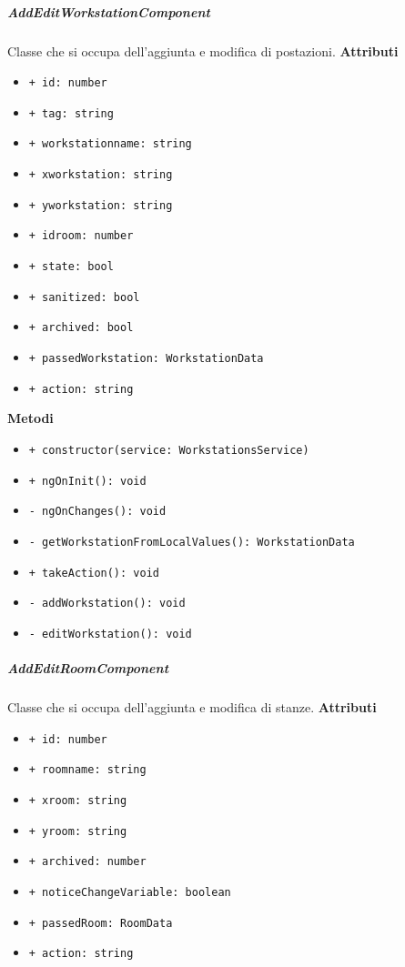 \subparagraph{AddEditWorkstationComponent}
Classe che si occupa dell'aggiunta e modifica di postazioni. \newline
\textbf{Attributi}
\begin{itemize}
	\item \texttt{+ id: number } 
	\item \texttt{+ tag: string } 
	\item \texttt{+ workstationname: string } 
	\item \texttt{+ xworkstation: string } 
	\item \texttt{+ yworkstation: string } 
	\item \texttt{+ idroom: number } 
	\item \texttt{+ state: bool } 
	\item \texttt{+ sanitized: bool } 
	\item \texttt{+ archived: bool } 
	\item \texttt{+ passedWorkstation: WorkstationData } 
	\item \texttt{+ action: string} 
\end{itemize}
\textbf{Metodi}
\begin{itemize}
	\item \texttt{+ constructor(service: WorkstationsService) }
	\item \texttt{+ ngOnInit(): void }
	\item \texttt{- ngOnChanges(): void }
	\item \texttt{- getWorkstationFromLocalValues(): WorkstationData }
	\item \texttt{+ takeAction(): void }
	\item \texttt{- addWorkstation(): void }
	\item \texttt{- editWorkstation(): void}
\end{itemize}
\subparagraph{AddEditRoomComponent}
Classe che si occupa dell'aggiunta e modifica di stanze. \newline
\textbf{Attributi}
\begin{itemize}
	\item \texttt{+ id: number 	}
	\item \texttt{+ roomname: string 	}
	\item \texttt{+ xroom: string 	}
	\item \texttt{+ yroom: string 	}
	\item \texttt{+ archived: number 	}
	\item \texttt{+ noticeChangeVariable: boolean 	}
	\item \texttt{+ passedRoom: RoomData 	}
	\item \texttt{+ action: string}
\end{itemize}
